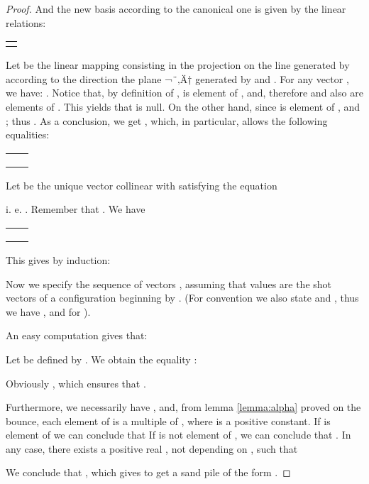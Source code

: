 \documentclass[11pt,a4paper]{llncs}
\begin{document}
\begin{proof}
And the new basis  according to the canonical one  is given by the linear relations:
\begin{center}
 \begin{tabular}{l}
   \\
   \\
   
 \end{tabular}
\end{center}

Let  be  the
 linear mapping consisting in the projection on the line  generated  by   according to the direction the plane ¬¨‚Ä† generated by  and . For any vector , we have:  . Notice that, by definition of ,  is element of , and,  therefore  and  also are elements of . This yields that  is null.
 On the other hand, since   is element of ,  and ;  thus  . As a conclusion, we get , which, in particular, allows the following equalities:

\begin{center}
 \begin{tabular}{rl}
    & \\
    & \\
    & 
 \end{tabular}
\end{center}
Let  be the unique vector collinear with  satisfying the equation

i. e.  .  Remember that . We have
\begin{center}
 \begin{tabular}{rl}
    & \\
    & \\
    & 

 \end{tabular}
\end{center}
This gives by induction: 



Now we specify the sequence of vectors ,  assuming that values  are the shot vectors of a configuration  beginning by .
 (For convention we also  state  and , thus we have ,  and  for ).

 An easy computation gives that:  
 

 Let  be defined by . We obtain   the equality :



Obviously , which ensures that  .

Furthermore,  we necessarily have , and, from lemma \ref{lemma:alpha} proved on the bounce, each element of  is a multiple of , where  is a positive constant.
If   is element of   we can conclude that 
If   is not element of  ,  we can conclude that . In any case,  there exists a positive real , not depending on ,   such that  


We conclude that , which gives  to get a sand pile of the form .
\end{proof}
\end{document}
